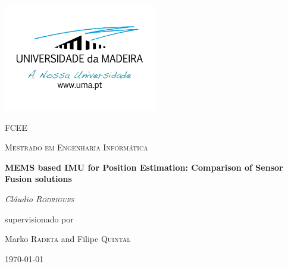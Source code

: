 \begin{titlepage}
	\centering
	\addtolength{\hoffset}{0cm}
	\centering
	\includegraphics[width=0.50\textwidth]{figures/logoUMa.png}\par\vspace{1cm}
	{\scshape\LARGE FCEE \par}
	\vspace{1cm}
	{\scshape\Large Mestrado em Engenharia Informática \par}
	\vspace{1.5cm}
	{\huge\bfseries MEMS based IMU for Position Estimation: Comparison of Sensor Fusion solutions \par}
	\vspace{2cm}
	{\Large\itshape Cláudio \textsc{Rodrigues}\par}
	\vfill
	supervisionado por \par
	Marko \textsc{Radeta} and Filipe \textsc{Quintal}

	\vfill

	{\large {}\today\par}
\end{titlepage}